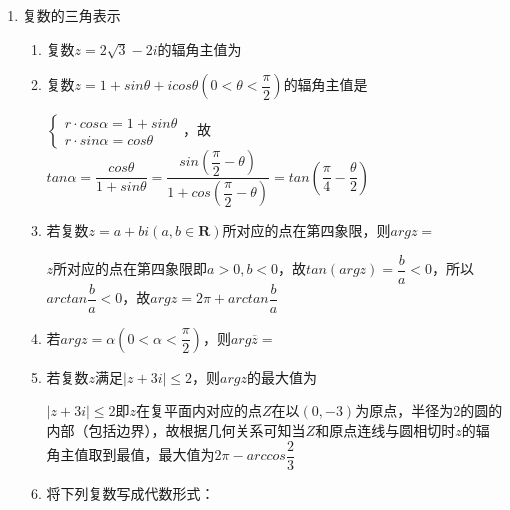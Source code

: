 \begin{enumerate}
\begin{enumerate}
\begin{jieda}
    \end{jieda}
    \item 若复平面内的点$A, B$分别对应于复数$2+i$和$1-i$，则线段$AB$的中垂线方程的复数形式为
    \begin{jieda}
        中垂线上的点到两端点的距离相等.
    \end{jieda}
\end{enumerate}
\item 复数的三角表示
\begin{enumerate}
    \item 复数$z = 2\sqrt{3} - 2i$的辐角主值为
    \item 复数$z = 1+sin\theta +  i cos\theta (0 < \theta < \dfrac{\pi}{2})$的辐角主值是
    \begin{jieda}
        $\left \{ \begin{array}{l}
             r \cdot cos\alpha = 1+sin\theta \\
             r \cdot sin\alpha = cos\theta
        \end{array} \right.$，故$tan\alpha = \dfrac{cos\theta}{1+sin\theta} = \dfrac{sin(\dfrac{\pi}{2} - \theta)}{1+cos(\dfrac{\pi}{2} - \theta)} = tan(\dfrac{\pi}{4} - \dfrac{\theta}{2})$
    \end{jieda}
    \item 若复数$z = a+bi(a, b \in \mathbf{R})$所对应的点在第四象限，则$arg z = $
    \begin{jieda}
        $z$所对应的点在第四象限即$a > 0, b < 0$，故$tan(argz) = \dfrac{b}{a} < 0$，所以$arctan\dfrac{b}{a} < 0$，故$argz = 2\pi + arctan\dfrac{b}{a}$
    \end{jieda}
    \item 若$argz = \alpha (0 < \alpha < \dfrac{\pi}{2})$，则$arg\overline{z} = $\blkda{$2\pi - \alpha$}
    \item 若复数$z$满足$|z+3i| \leq 2$，则$argz$的最大值为
    \begin{jieda}
        $|z+3i| \leq 2$即$z$在复平面内对应的点$Z$在以$(0, -3)$为原点，半径为2的圆的内部（包括边界），故根据几何关系可知当$Z$和原点连线与圆相切时$z$的辐角主值取到最值，最大值为$2\pi - arccos\dfrac{2}{3}$
    \end{jieda}
    \item 将下列复数写成代数形式：\\

\end{enumerate}
\end{enumerate}
